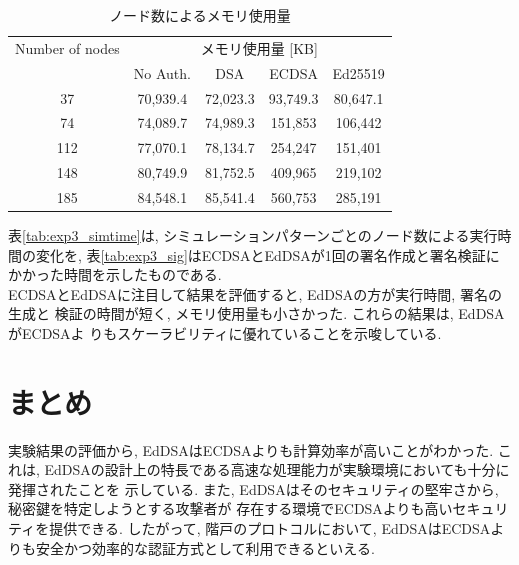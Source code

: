 \documentclass[a4j,9pt,twocolumn]{jsarticle}
\begin{document}
\vspace{-5mm}
\begin{table}[h]
    \centering
    \caption{ノード数によるメモリ使用量}
    \label{tab:exp3_memory}
    \begin{tabular}{c|cccc} \hline
        Number of nodes & \multicolumn{4}{c}{メモリ使用量 [KB]} \\ \cline{2-5}
                       & No Auth. & DSA & ECDSA & Ed25519 \\ \hline \hline
        37  &  70,939.4  &  72,023.3  &   93,749.3  &   80,647.1  \\
        74  &  74,089.7  &  74,989.3  &  151,853  &  106,442  \\
        112 &  77,070.1  &  78,134.7  &  254,247  &  151,401  \\
        148 &  80,749.9  &  81,752.5  &  409,965  &  219,102  \\
        185 &  84,548.1  &  85,541.4  &  560,753  &  285,191  \\ \hline
    \end{tabular}
\end{table}
\vspace{-3mm}
  

表\ref{tab:exp3_simtime}は, シミュレーションパターンごとのノード数による実行時間の変化を, 
表\ref{tab:exp3_sig}はECDSAとEdDSAが1回の署名作成と署名検証にかかった時間を示したものである. \\
\indent ECDSAとEdDSAに注目して結果を評価すると, EdDSAの方が実行時間, 署名の生成と
検証の時間が短く, メモリ使用量も小さかった. これらの結果は, EdDSAがECDSAよ
りもスケーラビリティに優れていることを示唆している. 

\section{まとめ}
\indent 実験結果の評価から, EdDSAはECDSAよりも計算効率が高いことがわかった. 
これは, EdDSAの設計上の特長である高速な処理能力が実験環境においても十分に発揮されたことを
示している. また, EdDSAはそのセキュリティの堅牢さから, 秘密鍵を特定しようとする攻撃者が
存在する環境でECDSAよりも高いセキュリティを提供できる. したがって, 階戸のプロトコルにおいて, 
EdDSAはECDSAよりも安全かつ効率的な認証方式として利用できるといえる. 
\end{document}
